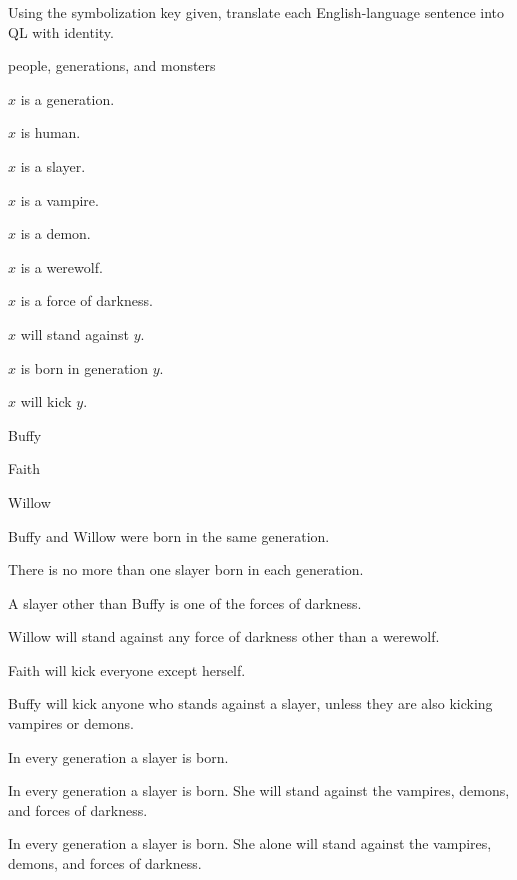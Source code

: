 \solutions
\problempart
\label{pr.QLbuffy}
Using the symbolization key given, translate each English-language sentence into QL with identity.
\begin{ekey}
\item[UD:] people, generations, and monsters
\item[Gx:] $x$ is a generation.
\item[Hx:] $x$ is human.
\item[Sx:] $x$ is a slayer.
\item[Vx:] $x$ is a vampire.
\item[Dx:] $x$ is a demon.
\item[Wx:] $x$ is a werewolf.
\item[Fx:] $x$ is a force of darkness.
\item[Axy:] $x$ will stand against $y$.
\item[Bxy:] $x$ is born in generation $y$.
\item[Kxy:] $x$ will kick $y$.
\item[b:] Buffy
\item[f:] Faith
\item[w:] Willow
\end{ekey}
\begin{earg}
\item Buffy and Willow were born in the same generation.
\item There is no more than one slayer born in each generation.
\item A slayer other than Buffy is one of the forces of darkness.
\item Willow will stand against any force of darkness other than a werewolf.
\item Faith will kick everyone except herself.
\item Buffy will kick anyone who stands against a slayer, unless they are also kicking vampires or demons.
\item In every generation a slayer is born.
\item In every generation a slayer is born. She will stand against the vampires, demons, and forces of darkness.
\item In every generation a slayer is born. She alone will stand against the vampires, demons, and forces of darkness.
\end{earg}



